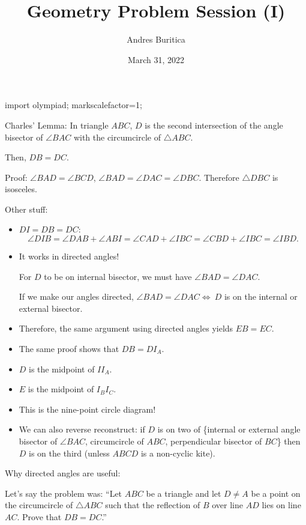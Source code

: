 \documentclass{article}
\title{Geometry Problem Session (I)}
\author{Andres Buritica}
\date{March 31, 2022}
\begin{document}
\maketitle
\begin{asydef}
  import olympiad;
  markscalefactor=1;
\end{asydef}
Charles' Lemma: In triangle $ABC$, $D$ is the second intersection of the angle
bisector of $\angle BAC$ with the circumcircle of $\triangle ABC$.

Then, $DB=DC$.

Proof: $\angle BAD=\angle BCD$, $\angle BAD=\angle DAC=\angle DBC$. Therefore
$\triangle DBC$ is isosceles.

Other stuff:
\begin{itemize}
  \item $DI=DB=DC$:
    \[\angle DIB=\angle DAB+\angle ABI=\angle CAD+\angle IBC=\angle CBD+\angle
      IBC=\angle IBD.\]
  \item It works in directed angles!

    For $D$ to be on internal bisector, we must have $\angle BAD=\angle DAC$.

    If we make our angles directed, $\angle BAD=\angle DAC\iff\ D$ is on the
    internal or external bisector.

  \item Therefore, the same argument using directed angles yields $EB=EC$.

  \item The same proof shows that $DB=DI_A$.
  \item $D$ is the midpoint of $II_A$.
  \item $E$ is the midpoint of $I_B I_C$.
  \item This is the nine-point circle diagram!
  \item We can also reverse reconstruct: if $D$ is on two of \{internal or
      external angle bisector of
    $\angle BAC$, circumcircle of $ABC$, perpendicular bisector of $BC$\} then
    $D$ is on the third (unless $ABCD$ is a non-cyclic kite).
\end{itemize}
Why directed angles are useful:

Let's say the problem was: ``Let $ABC$ be a triangle and let $D\ne A$ be a point
on the circumcircle of $\triangle ABC$ such that the reflection of $B$ over line
$AD$ lies on line $AC$. Prove that $DB=DC$.''
\end{document}

